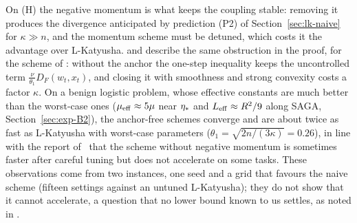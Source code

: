 On (H) the negative momentum is what keeps the coupling stable: removing it produces the divergence anticipated by
prediction (P2) of Section~\ref{sec:lk-naive} for $\kappa\gg n$, and the momentum scheme must be detuned, which costs it
the advantage over L-Katyusha.  and  describe the same obstruction in the
proof, for the scheme of : without the anchor the one-step inequality keeps the uncontrolled term
$\frac\nu{\theta_1}D_F(w_t,x_t)$, and closing it with smoothness and strong convexity costs a factor $\kappa$. On a benign
logistic problem, whose effective constants are much better than the worst-case ones ($\mu_{\mathrm{eff}}\approx5\mu$ near $\eta_\ast$
and $L_{\mathrm{eff}}\approx R^2/9$ along SAGA, Section~\ref{sec:exp-B2}), the anchor-free schemes converge and are about twice as
fast as L-Katyusha with worst-case parameters ($\theta_1=\sqrt{2n/(3\kappa)}=0.26$), in line with the report
of~\cite[Section~7.1]{allenzhu2018katyusha} that the scheme without negative momentum is sometimes faster after careful
tuning but does not accelerate on some tasks. These observations come from two instances, one seed and a grid that favours
the naive scheme (fifteen settings against an untuned L-Katyusha); they do not show that it cannot accelerate, a question
that no lower bound known to us settles, as noted in .
